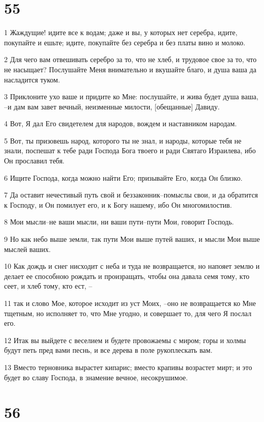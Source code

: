 \chapter{55}

\par 1 Жаждущие! идите все к водам; даже и вы, у которых нет серебра, идите, покупайте и ешьте; идите, покупайте без серебра и без платы вино и молоко.
\par 2 Для чего вам отвешивать серебро за то, что не хлеб, и трудовое свое за то, что не насыщает? Послушайте Меня внимательно и вкушайте благо, и душа ваша да насладится туком.
\par 3 Приклоните ухо ваше и придите ко Мне: послушайте, и жива будет душа ваша, --и дам вам завет вечный, неизменные милости, [обещанные] Давиду.
\par 4 Вот, Я дал Его свидетелем для народов, вождем и наставником народам.
\par 5 Вот, ты призовешь народ, которого ты не знал, и народы, которые тебя не знали, поспешат к тебе ради Господа Бога твоего и ради Святаго Израилева, ибо Он прославил тебя.
\par 6 Ищите Господа, когда можно найти Его; призывайте Его, когда Он близко.
\par 7 Да оставит нечестивый путь свой и беззаконник--помыслы свои, и да обратится к Господу, и Он помилует его, и к Богу нашему, ибо Он многомилостив.
\par 8 Мои мысли--не ваши мысли, ни ваши пути--пути Мои, говорит Господь.
\par 9 Но как небо выше земли, так пути Мои выше путей ваших, и мысли Мои выше мыслей ваших.
\par 10 Как дождь и снег нисходит с неба и туда не возвращается, но напояет землю и делает ее способною рождать и произращать, чтобы она давала семя тому, кто сеет, и хлеб тому, кто ест, --
\par 11 так и слово Мое, которое исходит из уст Моих, --оно не возвращается ко Мне тщетным, но исполняет то, что Мне угодно, и совершает то, для чего Я послал его.
\par 12 Итак вы выйдете с веселием и будете провожаемы с миром; горы и холмы будут петь пред вами песнь, и все дерева в поле рукоплескать вам.
\par 13 Вместо терновника вырастет кипарис; вместо крапивы возрастет мирт; и это будет во славу Господа, в знамение вечное, несокрушимое.

\chapter{56}

